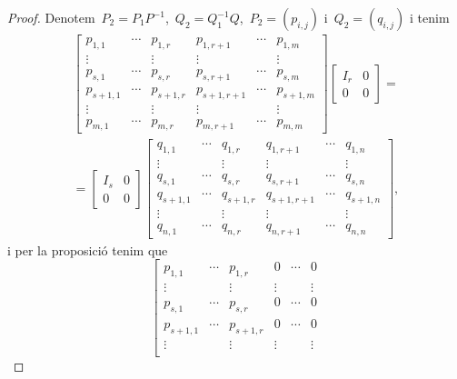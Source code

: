 \documentclass[../../main.tex]{subfiles}
\begin{document}
\begin{theorem}
\begin{proof}
			Denotem~\(P_{2}=P_{1}P^{-1}\),~\(Q_{2}=Q_{1}^{-1}Q\),~\(P_{2}=(p_{i,j})\) i~\(Q_{2}=(q_{i,j})\) i tenim
			\begin{multline*}
			\left[\begin{array}{ccc|ccc}
			p_{1,1} & \cdots & p_{1,r} & p_{1,r+1} & \cdots & p_{1,m} \\
			\vdots & & \vdots & \vdots & & \vdots \\
			p_{s,1} & \cdots & p_{s,r} & p_{s,r+1} & \cdots & p_{s,m} \\\hline
			p_{s+1,1} & \cdots & p_{s+1,r} & p_{s+1,r+1} & \cdots & p_{s+1,m} \\
			\vdots & & \vdots & \vdots & & \vdots \\
			p_{m,1} & \cdots & p_{m,r} & p_{m,r+1} & \cdots & p_{m,m}
			\end{array}\right]
			\left[\begin{array}{c|c}
			I_{r} & 0\\\hline
			0 & 0
			\end{array}\right]=\\=
			\left[\begin{array}{c|c}
			I_{s} & 0\\\hline
			0 & 0
			\end{array}\right]
			\left[\begin{array}{ccc|ccc}
			q_{1,1} & \cdots & q_{1,r} & q_{1,r+1} & \cdots & q_{1,n} \\
			\vdots & & \vdots & \vdots & & \vdots \\
			q_{s,1} & \cdots & q_{s,r} & q_{s,r+1} & \cdots & q_{s,n} \\\hline
			q_{s+1,1} & \cdots & q_{s+1,r} & q_{s+1,r+1} & \cdots & q_{s+1,n} \\
			\vdots & & \vdots & \vdots & & \vdots \\
			q_{n,1} & \cdots & q_{n,r} & q_{n,r+1} & \cdots & q_{n,n}
			\end{array}\right],
			\end{multline*}
			i per la proposició  tenim que
			\[\left[\begin{array}{cccccc}
			p_{1,1} & \cdots & p_{1,r} & 0 & \cdots & 0 \\
			\vdots & & \vdots & \vdots & & \vdots \\
			p_{s,1} & \cdots & p_{s,r} & 0 & \cdots & 0 \\
			p_{s+1,1} & \cdots & p_{s+1,r} & 0 & \cdots & 0 \\
			\vdots & & \vdots & \vdots & & \vdots \\

\end{array}\]
\end{proof}
\end{theorem}
\end{document}
